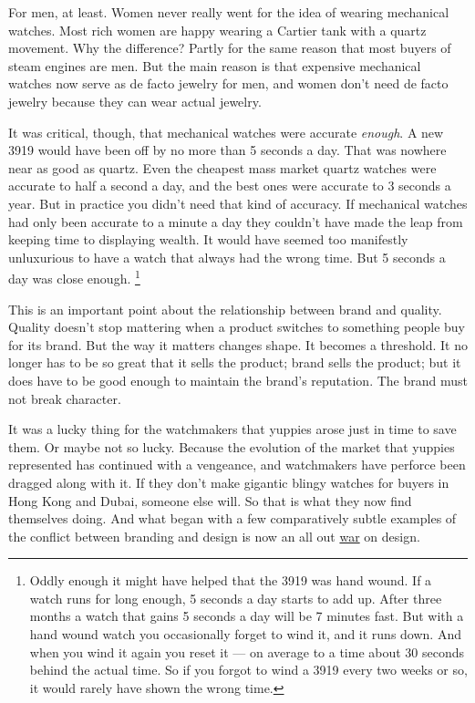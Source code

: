 For men, at least. Women never really went for the idea of wearing
mechanical watches. Most rich women are happy wearing a Cartier tank
with a quartz movement. Why the difference? Partly for the same reason
that most buyers of steam engines are men. But the main reason is that
expensive mechanical watches now serve as de facto jewelry for men, and
women don't need de facto jewelry because they can wear actual jewelry.

It was critical, though, that mechanical watches were accurate
\emph{enough}. A new 3919 would have been off by no more than 5 seconds
a day. That was nowhere near as good as quartz. Even the cheapest mass
market quartz watches were accurate to half a second a day, and the best
ones were accurate to 3 seconds a year. But in practice you didn't need
that kind of accuracy. If mechanical watches had only been accurate to a
minute a day they couldn't have made the leap from keeping time to
displaying wealth. It would have seemed too manifestly unluxurious to
have a watch that always had the wrong time. But 5 seconds a day was
close enough. \footnote{Oddly enough it might have helped that the 3919 was hand wound.
If a watch runs for long enough, 5 seconds a day starts to add up. After
three months a watch that gains 5 seconds a day will be 7 minutes fast.
But with a hand wound watch you occasionally forget to wind it, and it
runs down. And when you wind it again you reset it --- on average to a
time about 30 seconds behind the actual time. So if you forgot to wind a
3919 every two weeks or so, it would rarely have shown the wrong time.}

This is an important point about the relationship between brand and
quality. Quality doesn't stop mattering when a product switches to
something people buy for its brand. But the way it matters changes
shape. It becomes a threshold. It no longer has to be so great that it
sells the product; brand sells the product; but it does have to be good
enough to maintain the brand's reputation. The brand must not break
character.

It was a lucky thing for the watchmakers that yuppies arose just in time
to save them. Or maybe not so lucky. Because the evolution of the market
that yuppies represented has continued with a vengeance, and watchmakers
have perforce been dragged along with it. If they don't make gigantic
blingy watches for buyers in Hong Kong and Dubai, someone else will. So
that is what they now find themselves doing. And what began with a few
comparatively subtle examples of the conflict between branding and
design is now an all out
\href{https://www.patek.com/en/collection/grand-complications/6300-400g-001}{war}
on design.

